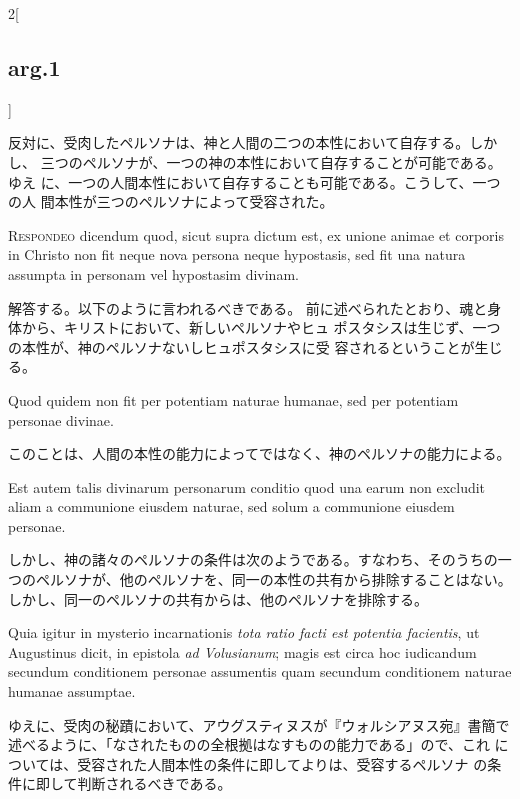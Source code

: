 \documentclass[paper=a4paper,fontsize=10pt,jafontsize=9pt,titlepage]{jlreq}
\begin{document}
\begin{paracol}{2}[\subsection{arg.1}]
\switchcolumn

反対に、受肉したペルソナは、神と人間の二つの本性において自存する。しかし、
 三つのペルソナが、一つの神の本性において自存することが可能である。ゆえ
 に、一つの人間本性において自存することも可能である。こうして、一つの人
 間本性が三つのペルソナによって受容された。


{\scshape Respondeo} dicendum quod, sicut supra dictum est, ex unione animae et
corporis in Christo non fit neque nova persona neque hypostasis, sed fit
una natura assumpta in personam vel hypostasim divinam.

\switchcolumn

解答する。以下のように言われるべきである。
前に述べられたとおり、魂と身体から、キリストにおいて、新しいペルソナやヒュ
 ポスタシスは生じず、一つの本性が、神のペルソナないしヒュポスタシスに受
 容されるということが生じる。

\switchcolumn*

Quod quidem non
fit per potentiam naturae humanae, sed per potentiam personae
divinae.

\switchcolumn

このことは、人間の本性の能力によってではなく、神のペルソナの能力による。

\switchcolumn*

Est autem talis divinarum personarum conditio quod una earum
non excludit aliam a communione eiusdem naturae, sed solum a communione
eiusdem personae.

\switchcolumn

しかし、神の諸々のペルソナの条件は次のようである。すなわち、そのうちの一
 つのペルソナが、他のペルソナを、同一の本性の共有から排除することはない。
しかし、同一のペルソナの共有からは、他のペルソナを排除する。

\switchcolumn*

Quia igitur in mysterio incarnationis {\itshape tota ratio facti
est potentia facientis}, ut Augustinus dicit, in epistola {\itshape ad Volusianum};
magis est circa hoc iudicandum secundum conditionem personae assumentis
quam secundum conditionem naturae humanae assumptae.

\switchcolumn

ゆえに、受肉の秘蹟において、アウグスティヌスが『ウォルシアヌス宛』書簡で
 述べるように、「なされたものの全根拠はなすものの能力である」ので、これ
 については、受容された人間本性の条件に即してよりは、受容するペルソナ
 の条件に即して判断されるべきである。


\end{paracol}
\end{document}
